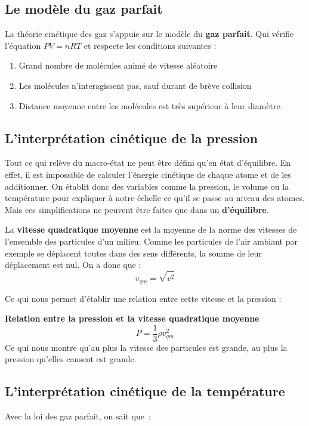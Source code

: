 \documentclass{article}
\begin{document}
\subsection{Le modèle du gaz parfait}
La théorie cinétique des gaz s'appuie sur le modèle du \textbf{gaz parfait}. Qui vérifie l'équation $PV = nRT$ et respecte les conditions suivantes :
\begin{enumerate}
    \item Grand nombre de molécules animé de vitesse aléatoire
    \item Les molécules n'interagissent pas, sauf durant de brève collision
    \item Distance moyenne entre les molécules est très supérieur à leur diamètre.
\end{enumerate}

\subsection{L'interprétation cinétique de la pression}
Tout ce qui relève du macro-état ne peut être défini qu'en état d'équilibre. En effet, il est impossible de calculer l'énergie cinétique de chaque atome et de les additionner. On établit donc des variables comme la pression, le volume ou la température pour expliquer à notre échelle ce qu'il se passe au niveau des atomes. Mais ces simplifications ne peuvent être faites que dans un \textbf{d'équilibre}.
\newline

La \textbf{vitesse quadratique moyenne} est la moyenne de la norme des vitesses de l'ensemble des particules d'un milieu. Comme les particules de l'air ambiant par exemple se déplacent toutes dans des sens différents, la somme de leur déplacement est nul. On a donc que :
\[v_{qm} = \sqrt{\overline{v^2}}\]
\newline

Ce qui nous permet d'établir une relation entre cette vitesse et la pression :
\newline

\noindent
\textbf{Relation entre la pression et la vitesse quadratique moyenne}
\[P = \frac{1}{3}\rho v^2_{qm}\]
Ce qui nous montre qu'au plus la vitesse des particules est grande, au plus la pression qu'elles causent est grande.

\subsection{L'interprétation cinétique de la température}
Avec la loi des gaz parfait, on sait que :
\newline
\end{document}
